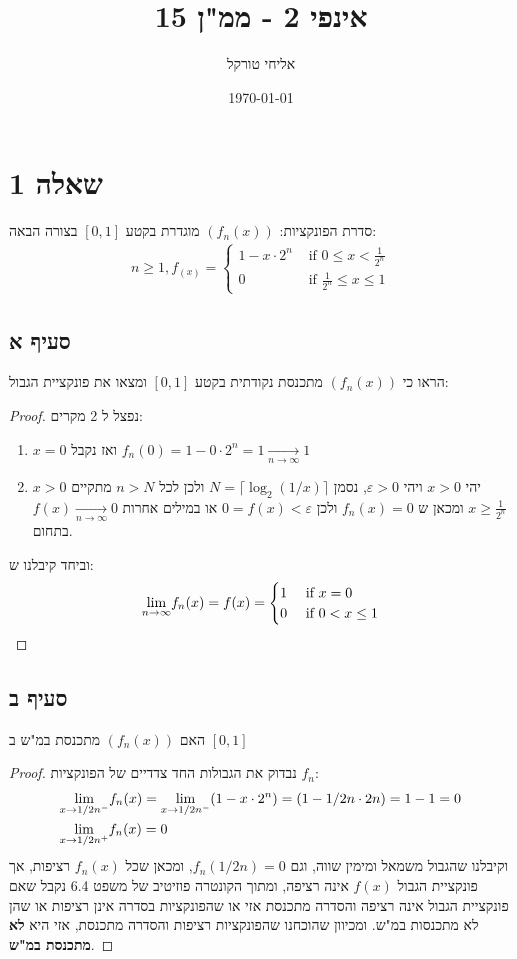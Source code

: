 \documentclass{article}
\title{אינפי 2 - ממ"ן 15}
\author{אליחי טורקל \ID}
\date\today
\begin{document}
	\maketitle %


	\section*{שאלה 1}
	סדרת הפונקציות: $(f_n(x))$ מוגדרת בקטע $[0,1]$ בצורה הבאה:
	\begin{align*}
		n \geq 1,
		f_(x) = \begin{cases}
			1 - x \cdot 2^n &\text{ if } 0 \leq x < \frac{1}{2^n} \\
			0 &\text{ if } \frac{1}{2^n} \leq x \leq 1
		\end{cases}
	\end{align*}

	\subsection*{סעיף א}
	הראו כי $(f_n(x))$ מתכנסת נקודתית בקטע $[0,1]$ ומצאו את פונקציית הגבול:
	\begin{proof}
		נפצל ל 2 מקרים:
		\begin{enumerate}
			\item $x = 0$ ואז נקבל $f_n(0) = 1 - 0\cdot 2^n = 1 \xrightarrow[n \to \infty]{} 1$
			\item $x > 0$ יהי $x > 0$ ויהי $\varepsilon > 0$, נסמן $N=\lceil \log_2(1/x) \rceil$ ולכן לכל $n>N$ מתקיים $x \geq \frac{1}{2^n}$
			ומכאן ש $f_n(x) = 0$ ולכן $0=f(x) < \varepsilon$ או במילים אחרות $f(x) \xrightarrow[n \to \infty]{} 0$ בתחום.
		\end{enumerate}
		וביחד קיבלנו ש:
		\begin{align*}
			\displaystyle{\lim_{n \to \infty}} f_n(x) = f(x) = \begin{cases}
				1 &\text{ if } x = 0 \\
				0 &\text{ if } 0 < x \leq 1
			\end{cases}
		\end{align*}
	\end{proof}
	\subsection*{סעיף ב}
	האם $(f_n(x))$ מתכנסת במ"ש ב $[0,1]$
	\begin{proof}
		נבדוק את הגבולות החד צדדיים של הפונקציות $f_n$:
		\begin{align*}
			&\displaystyle{\lim_{x \to 1/2n^-}} f_n(x)
			= \displaystyle{\lim_{x \to 1/2n^-}} (1 - x \cdot 2^n) = (1 - 1/2n \cdot 2n) = 1 -1 = 0 \\
			&\displaystyle{\lim_{x \to 1/2n^+}} f_n(x)
			= 0
		\end{align*}
		וקיבלנו שהגבול משמאל ומימין שווה, וגם $f_n(1/2n) = 0$, ומכאן שכל $f_n(x)$ רציפות,
		אך פונקציית הגבול $f(x)$ אינה רציפה, ומתוך הקונטרה פוזיטיב של משפט 6.4 נקבל שאם פונקציית הגבול אינה רציפה והסדרה מתכנסת אזי או שהפונקציות בסדרה אינן רציפות או שהן לא מתכנסות במ"ש.
		ומכיוון שהוכחנו שהפונקציות רציפות והסדרה מתכנסת, אזי היא \textbf{לא מתכנסת במ"ש}.
	\end{proof}
\end{document}
